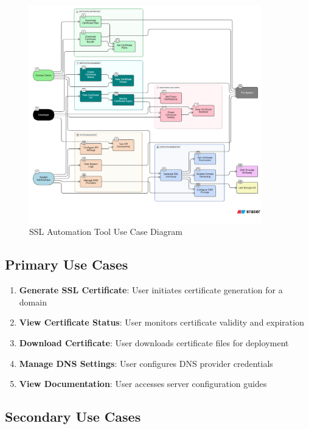 \begin{figure}[h]
\centering
\includegraphics[width=0.9\textwidth]{diagram-images/3.3-use-case-diagram.png}
\caption{SSL Automation Tool Use Case Diagram}
\label{fig:use-case-diagram}
\end{figure}

\subsection{Primary Use Cases}

\begin{enumerate}
    \item \textbf{Generate SSL Certificate}: User initiates certificate generation for a domain
    \item \textbf{View Certificate Status}: User monitors certificate validity and expiration
    \item \textbf{Download Certificate}: User downloads certificate files for deployment
    \item \textbf{Manage DNS Settings}: User configures DNS provider credentials
    \item \textbf{View Documentation}: User accesses server configuration guides
\end{enumerate}

\subsection{Secondary Use Cases}

